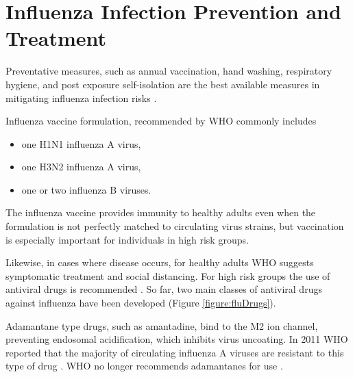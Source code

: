 \section{Influenza Infection Prevention and Treatment}

Preventative measures, such as annual vaccination, hand washing, respiratory hygiene, and post exposure self-isolation are the best available measures in mitigating influenza infection risks \cite{influenza_seasonal_2018}.

Influenza vaccine formulation, recommended by WHO commonly includes \cite{RecommendedCompositionVaccines}

\begin{itemize}
    \item one H1N1 influenza A virus,
    \item one H3N2 influenza A virus,
    \item one or two influenza B viruses.
\end{itemize}

The influenza vaccine provides immunity to healthy adults even when the formulation is not perfectly matched to circulating virus strains, but vaccination is especially important for individuals in high risk groups.

Likewise, in cases where disease occurs, for healthy adults WHO suggests symptomatic treatment and social distancing. For high risk groups the use of antiviral drugs is recommended \cite{influenza_seasonal_2018}. So far, two main classes of antiviral drugs against influenza have been developed (Figure \ref{figure:fluDrugs}).

Adamantane type drugs, such as amantadine, bind to the M2 ion channel, preventing endosomal acidification, which inhibits virus uncoating. In 2011 WHO reported that the majority of circulating influenza A viruses are resistant to this type of drug \cite{whoAntivirals2011}. WHO no longer recommends adamantanes for use \cite{influenza_seasonal_2018}.

